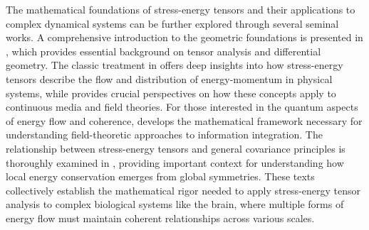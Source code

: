 The mathematical foundations of stress-energy tensors and their applications to complex dynamical systems can be further explored through several seminal works. A comprehensive introduction to the geometric foundations is presented in \cite{Frankel2011}, which provides essential background on tensor analysis and differential geometry. The classic treatment in \cite{Misner1973} offers deep insights into how stress-energy tensors describe the flow and distribution of energy-momentum in physical systems, while \cite{Landau1987} provides crucial perspectives on how these concepts apply to continuous media and field theories. For those interested in the quantum aspects of energy flow and coherence, \cite{Peskin1995} develops the mathematical framework necessary for understanding field-theoretic approaches to information integration. The relationship between stress-energy tensors and general covariance principles is thoroughly examined in \cite{Wald1984}, providing important context for understanding how local energy conservation emerges from global symmetries. These texts collectively establish the mathematical rigor needed to apply stress-energy tensor analysis to complex biological systems like the brain, where multiple forms of energy flow must maintain coherent relationships across various scales.